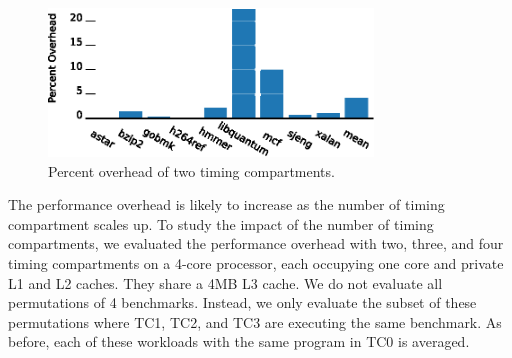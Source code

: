 \begin{figure}
   \begin{center}
       \includegraphics[width=3.4in]{figs/two_tcs.eps}
       \caption{Percent overhead of two timing compartments.}
       \label{fig:two_tc_overhead}
   \end{center}
\end{figure}



The performance overhead is likely to increase as the number of timing 
compartment scales up. To study the impact of the number of timing 
compartments, we evaluated the performance overhead with two, three, and four 
timing compartments on a 4-core  processor, each occupying one core and private 
L1 and L2 caches. They share a 4MB L3 cache. We do not evaluate all 
permutations of 4 benchmarks. Instead, we only evaluate the subset of these 
permutations where TC1, TC2, and TC3 are executing the same benchmark. As 
before, each of these workloads with the same program in TC0 is averaged.

